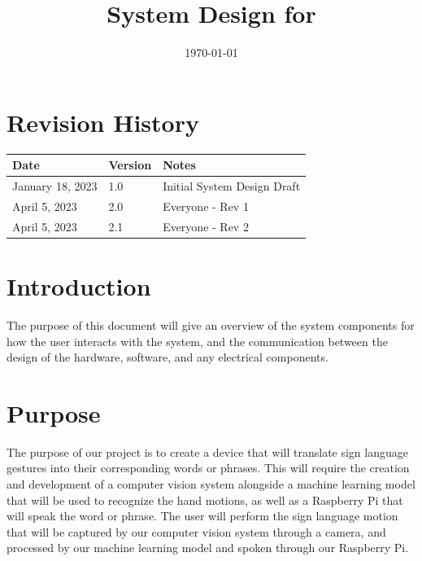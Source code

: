 \documentclass[12pt, titlepage]{article}
\begin{document}
\title{System Design for \progname{}} 
\author{\authname}
\date{\today}

\maketitle


\section{Revision History}

\begin{tabularx}{\textwidth}{p{3cm}p{2cm}X}
\toprule {\bf Date} & {\bf Version} & {\bf Notes}\\
\midrule
January 18, 2023 & 1.0 & Initial System Design Draft\\
April 5, 2023 & 2.0 & Everyone - Rev 1\\
April 5, 2023 & 2.1 & Everyone - Rev 2\\

\bottomrule
\end{tabularx}

\newpage

\tableofcontents

\newpage

\listoftables

\listoffigures

\newpage


\section{Introduction}
The purpose of this document will give an overview of the system components for how the user interacts with the system, 
and the communication between the design of the hardware, software, and any electrical components.

\section{Purpose}
The purpose of our project is to create a device that will translate sign language gestures into their corresponding words 
or phrases. This will require the creation and development of a computer vision system alongside a machine learning model that 
will be used to recognize the hand motions, as well as a Raspberry Pi that will speak the word or phrase. The user will perform 
the sign language motion that will be captured by our computer vision system through a camera, and processed by our machine learning 
model and spoken through our Raspberry Pi.
\end{document}

